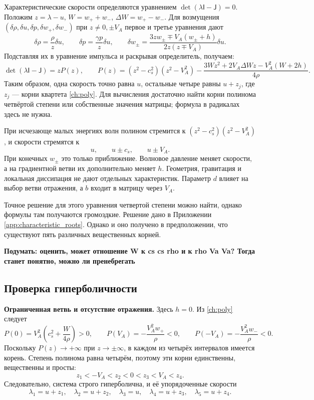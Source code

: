 \documentclass[11pt,a4paper]{article}
\newcommand{\VA}{V_A}
\begin{document}
Характеристические скорости определяются уравнением
$\det(\lambda\mathsf I-\mathsf J)=0$.
Положим $z=\lambda-u$, $W=w_++w_-$, $\Delta W=w_+-w_-$.
Для возмущения $(\delta\rho,\delta u,\delta p,\delta w_+,\delta w_-)$
при $z\ne0,\pm\VA$ первое и третье уравнения дают
\[
 \delta\rho=\frac{\rho}{z}\delta u,\qquad
 \delta p=\frac{\gamma p}{z}\delta u,
 \qquad
 \delta w_\pm=
 \frac{3z w_\pm\mp\VA(w_\pm+h)}{2z(z\mp\VA)}\delta u.
\]
Подставляя их в уравнение импульса и раскрывая определитель,
получаем:
\begin{equation}
 \det(\lambda\mathsf I-\mathsf J)=zP(z),\qquad
 P(z)=(z^2-c_s^2)(z^2-\VA^2)
 -\frac{3Wz^2+2\VA\Delta Wz-\VA^2(W+2h)}{4\rho}.
 \label{ch:poly}
\end{equation}
Таким образом, одна скорость точно равна $u$, остальные четыре равны
$u+z_j$, где $z_j$ --- корни квартета \eqref{ch:poly}.
Для вычисления достаточно найти корни полинома четвёртой степени
или собственные значения матрицы; формула в радикалах здесь не нужна.

При исчезающе малых энергиях волн полином стремится к
$(z^2-c_s^2)(z^2-\VA^2)$, и скорости стремятся к
\[
 u,\qquad u\pm c_s,\qquad u\pm\VA.
\]
При конечных $w_\pm$ это только приближение.
Волновое давление меняет скорости, а на градиентной ветви их
дополнительно меняет $h$. Геометрия, гравитация и локальная диссипация
не дают отдельных характеристик. Параметр $d$ влияет на выбор ветви
отражения, а $b$ входит в матрицу через $\VA$.

Точное решение для этого уравнения четвертой степени можно найти, однако формулы там получаются громоздкие. Решение дано в Приложении \ref{app:characteristic_roots}. Однако и оно получено в предположении, что существуют пять различных вещественных корней.

\textbf{Подумать: оценить, может отношение W к cs cs rho и к rho Va Va? Тогда станет понятно, можно ли пренебрегать}

\subsection{Проверка гиперболичности}

\textbf{Ограниченная ветвь и отсутствие отражения.}
Здесь $h=0$. Из \eqref{ch:poly} следует
\[
 P(0)=\VA^2\left(c_s^2+\frac W{4\rho}\right)>0,
 \qquad P(\VA)=-\frac{\VA^2w_+}{\rho}<0,
 \qquad P(-\VA)=-\frac{\VA^2w_-}{\rho}<0.
\]
Поскольку $P(z)\to+\infty$ при $z\to\pm\infty$, в каждом
из четырёх интервалов имеется корень. Степень полинома равна четырём,
поэтому эти корни единственны, вещественны и просты:
\begin{equation}
 z_1<-\VA<z_2<0<z_3<\VA<z_4.
 \label{ch:order}
\end{equation}
Следовательно, система строго гиперболична, и её упорядоченные скорости
\begin{equation}
 \lambda_1=u+z_1,\quad\lambda_2=u+z_2,\quad
 \lambda_3=u,\quad\lambda_4=u+z_3,\quad\lambda_5=u+z_4.
 \label{ch:speeds}
\end{equation}
\end{document}
